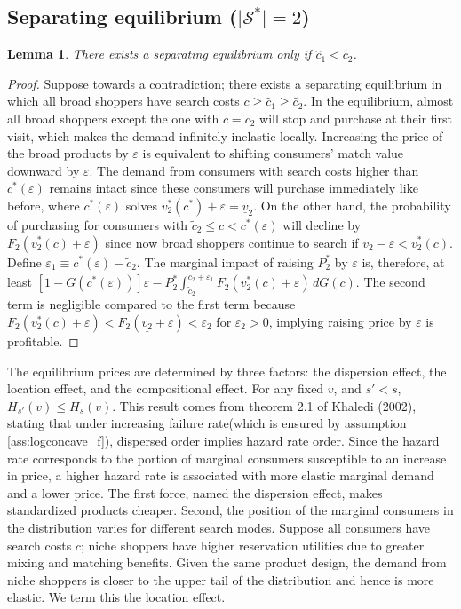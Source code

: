 \documentclass[14pt]{article}
\theoremstyle{plain}
\newtheorem{lemma}[thm]{Lemma}
\theoremstyle{definition}
\theoremstyle{remark}
\DeclareRobustCommand\1{\futurelet\oneNext\oneCheck}
\renewcommand{\S}{\mathcal{S}}
\begin{document}
\subsection{Separating equilibrium ($\lvert \S^* \rvert=2$)}
\begin{lemma}\label{lemm:c_hat_bound}
There exists a separating equilibrium only if $\hat{c}_1< \tilde{c_2}$.
\end{lemma}
\begin{proof}
Suppose towards a contradiction; there exists a separating equilibrium in which all broad shoppers have search costs  $ c\geq\hat{c}_1\geq\tilde{c_2}$. In the equilibrium, almost all broad shoppers except the one with $c=\tilde{c}_2$ will stop and purchase at their first visit, which makes the demand infinitely inelastic locally. Increasing the price of the broad products by $\varepsilon$ is equivalent to shifting consumers' match value downward by $\varepsilon$. The demand from consumers with search costs higher than $c^*(\varepsilon)$ remains intact since these consumers will purchase immediately like before, where $c^*(\varepsilon)$ solves $v_2^*(c^*)+\varepsilon = \underline{v}_2$. On the other hand, the probability of purchasing for consumers with $\tilde{c}_2\leq c<c^*(\varepsilon)$ will decline by $F_2(v_2^*(c)+\varepsilon)$ since now broad shoppers continue to search if $v_2-\varepsilon < v_2^*(c)$. Define $\varepsilon_1 \equiv c^*(\varepsilon)-\tilde{c}_2$. The marginal impact of raising $P_2^*$ by $\varepsilon$ is, therefore, at least $[1-G(c^*(\varepsilon))]\varepsilon-P_2^*\int_{\tilde{c}_2}^{\tilde{c}_2+\varepsilon_1}F_2(v_2^*(c)+\varepsilon)\,dG(c)$. The second term is negligible compared to the first term because $F_2(v_2^*(c)+\varepsilon)<F_2(\underline{v_2}+\varepsilon)<\varepsilon_2$ for $\varepsilon_2>0$, implying raising price by $\varepsilon$ is profitable.
\end{proof}
The equilibrium prices are determined by three factors: the dispersion effect, the location effect, and the compositional effect.
For any fixed $v$, and $s'<s$, $H_{s'}(v)\leq H_{s}(v)$. This result comes from theorem 2.1 of Khaledi (2002), stating that under increasing failure rate(which is ensured by assumption \ref{ass:logconcave_f}), dispersed order implies hazard rate order. Since the hazard rate corresponds to the portion of marginal consumers susceptible to an increase in price, a higher hazard rate is associated with more elastic marginal demand and a lower price. The first force, named the dispersion effect, makes standardized products cheaper. Second, the position of the marginal consumers in the distribution varies for different search modes. Suppose all consumers have search costs $c$; niche shoppers have higher reservation utilities due to greater mixing and matching benefits. Given the same product design, the demand from niche shoppers is closer to the upper tail of the distribution and hence is more elastic. We term this the location effect.
\end{document}
